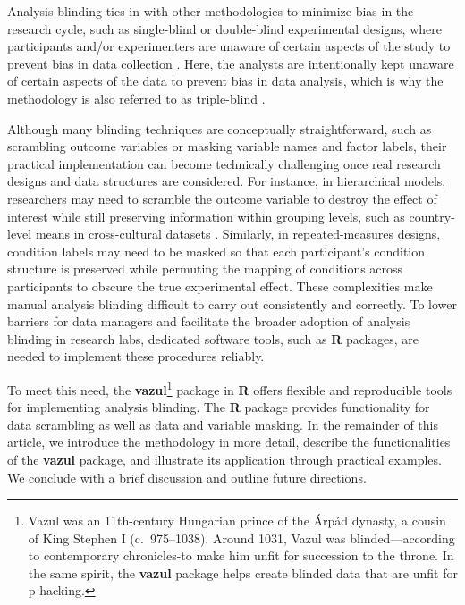 Analysis blinding ties in with other methodologies to minimize bias in the research cycle, such as single-blind or double-blind experimental designs, where participants and/or experimenters are unaware of certain aspects of the study to prevent bias in data collection \citep{schulz2002blinding}. Here, the analysts are intentionally kept unaware of certain aspects of the data to prevent bias in data analysis, which is why the methodology is also referred to as triple-blind \citep{schulz2002blinding}.

Although many blinding techniques are conceptually straightforward, such as scrambling outcome variables or masking variable names and factor labels, their practical implementation can become technically challenging once real research designs and data structures are considered. For instance, in hierarchical models, researchers may need to scramble the outcome variable to destroy the effect of interest while still preserving information within grouping levels, such as country-level means in cross-cultural datasets \citep[e.g.,][]{sarafoglou2023comparing}. Similarly, in repeated-measures designs, condition labels may need to be masked so that each participant's condition structure is preserved while permuting the mapping of conditions across participants to obscure the true experimental effect. These complexities make manual analysis blinding difficult to carry out consistently and correctly. To lower barriers for data managers and facilitate the broader adoption of analysis blinding in research labs, dedicated software tools, such as \textbf{R} packages, are needed to implement these procedures reliably.

To meet this need, the \textbf{vazul}\footnote{Vazul was an 11th-century Hungarian prince of the Árpád dynasty, a cousin of King Stephen I (c.~975--1038). Around 1031, Vazul was blinded---according to contemporary chronicles-to make him unfit for succession to the throne. In the same spirit, the \textbf{vazul} package helps create blinded data that are unfit for p-hacking.} package \citep{Nagy2026-gb} in \textbf{R} \citep{R2025} offers flexible and reproducible tools for implementing analysis blinding. The \textbf{R} package provides functionality for data scrambling as well as data and variable masking. In the remainder of this article, we introduce the methodology in more detail, describe the functionalities of the \textbf{vazul} package, and illustrate its application through practical examples. We conclude with a brief discussion and outline future directions.

